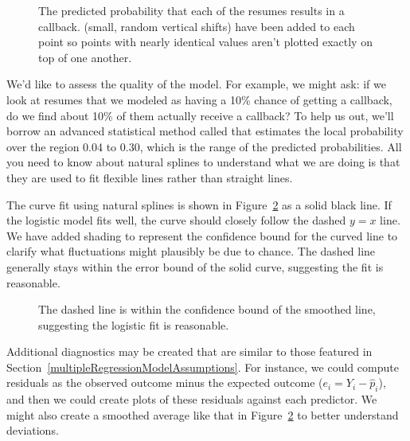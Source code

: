\begin{figure}[h]
  \centering
  \caption{The predicted probability that each of the
      \resN{} resumes results in a callback.
      (small, random vertical shifts) have been added
      to each point so points with nearly identical
      values aren't plotted exactly on top of one another.}
  \label{logisticModelPredict}
\end{figure}

We'd like to assess the quality of the model.
For example, we might ask:
if we look at resumes that we modeled as having
a 10\% chance of getting a callback, do we find
about 10\% of them actually receive a callback?
To help us out, we'll borrow an advanced statistical
method called  that estimates
the local probability over the region 0.04 to 0.30,
which is the range of the predicted probabilities.
All you need to know about natural splines to understand
what we are doing is that they are used to fit flexible
lines rather than straight lines.

The curve fit using natural splines is shown in
Figure~\ref{logisticModelSpline} as a solid black line.
If the logistic model fits well, the curve should closely
follow the dashed $y = x$ line.
We have added shading to represent the confidence bound for
the curved line to clarify what fluctuations might plausibly
be due to chance.
The dashed line generally stays within the error bound
of the solid curve, suggesting the fit is reasonable.

\begin{figure}
  \centering
  \caption{The dashed line is within the confidence bound
       of the smoothed line, suggesting the logistic fit is
       reasonable.}
  \label{logisticModelSpline}
\end{figure}

Additional diagnostics may be created that are similar to those
featured in Section~\ref{multipleRegressionModelAssumptions}.
For instance, we could compute residuals as
the observed outcome minus the expected outcome
($e_i = Y_i - \hat{p}_i$),
and then we could create plots of these residuals
against each predictor.
We might also create a smoothed average like that in
Figure~\ref{logisticModelSpline} to better understand
deviations.




